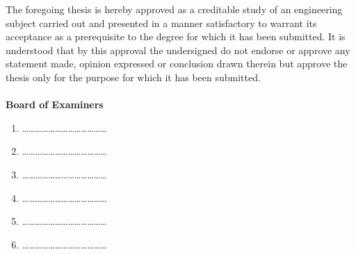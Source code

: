 The foregoing thesis is hereby approved as a creditable study of an
engineering subject carried out and presented in a manner satisfactory
to warrant its acceptance as a prerequisite to the degree for which it
has been submitted. It is understood that by this approval the undersigned
do not endorse or approve any statement made, opinion expressed or
conclusion drawn therein but approve the thesis only for the purpose 
for which it has been submitted. \\ \\
{\Large \bf Board of Examiners}
%
\begin{enumerate}
\item
\ldots\ldots\ldots\ldots\ldots\ldots\ldots\ldots\ldots\ldots\ldots\ldots\ldots
\\
\item
\ldots\ldots\ldots\ldots\ldots\ldots\ldots\ldots\ldots\ldots\ldots\ldots\ldots
\\
\item
\ldots\ldots\ldots\ldots\ldots\ldots\ldots\ldots\ldots\ldots\ldots\ldots\ldots
\\
\item
\ldots\ldots\ldots\ldots\ldots\ldots\ldots\ldots\ldots\ldots\ldots\ldots\ldots
\\
\item
\ldots\ldots\ldots\ldots\ldots\ldots\ldots\ldots\ldots\ldots\ldots\ldots\ldots
\\
\item
\ldots\ldots\ldots\ldots\ldots\ldots\ldots\ldots\ldots\ldots\ldots\ldots\ldots
\end{enumerate}






